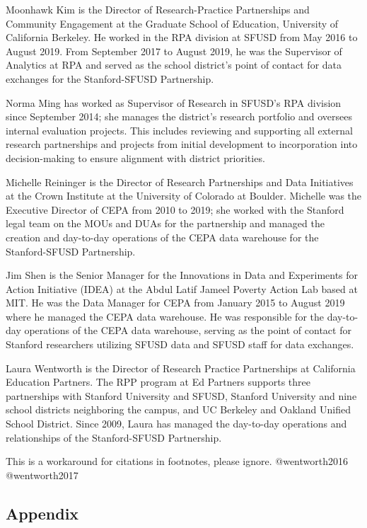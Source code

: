 \documentclass[
]{WileySix}
\begin{document}
Moonhawk Kim is the Director of Research-Practice Partnerships and Community Engagement at the Graduate School of Education, University of California Berkeley. He worked in the RPA division at SFUSD from May 2016 to August 2019. From September 2017 to August 2019, he was the Supervisor of Analytics at RPA and served as the school district's point of contact for data exchanges for the Stanford-SFUSD Partnership.

Norma Ming has worked as Supervisor of Research in SFUSD's RPA division since September 2014; she manages the district's research portfolio and oversees internal evaluation projects. This includes reviewing and supporting all external research partnerships and projects from initial development to incorporation into decision-making to ensure alignment with district priorities.

Michelle Reininger is the Director of Research Partnerships and Data Initiatives at the Crown Institute at the University of Colorado at Boulder. Michelle was the Executive Director of CEPA from 2010 to 2019; she worked with the Stanford legal team on the MOUs and DUAs for the partnership and managed the creation and day-to-day operations of the CEPA data warehouse for the Stanford-SFUSD Partnership.

Jim Shen is the Senior Manager for the Innovations in Data and Experiments for Action Initiative (IDEA) at the Abdul Latif Jameel Poverty Action Lab based at MIT. He was the Data Manager for CEPA from January 2015 to August 2019 where he managed the CEPA data warehouse. He was responsible for the day-to-day operations of the CEPA data warehouse, serving as the point of contact for Stanford researchers utilizing SFUSD data and SFUSD staff for data exchanges.

Laura Wentworth is the Director of Research Practice Partnerships at California Education Partners. The RPP program at Ed Partners supports three partnerships with Stanford University and SFUSD, Stanford University and nine school districts neighboring the campus, and UC Berkeley and Oakland Unified School District. Since 2009, Laura has managed the day-to-day operations and relationships of the Stanford-SFUSD Partnership.

\begin{invisible}
This is a workaround for citations in footnotes, please ignore.
@wentworth2016 @wentworth2017
\end{invisible}

\hypertarget{appendix-5}{%
\subsection*{Appendix}\label{appendix-5}}
\end{document}
